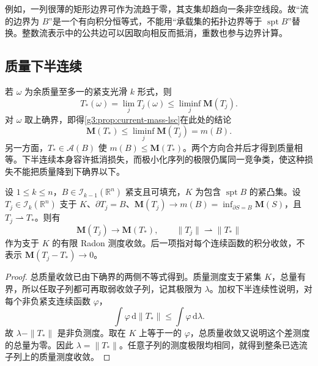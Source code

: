 \ProseParagraphBreak
例如，一列很薄的矩形边界可作为流趋于零，其支集却趋向一条非空线段。故“流的边界为 \(B\)”是一个有向积分恒等式，不能用“承载集的拓扑边界等于 \(\operatorname{spt}B\)”替换。整数流表示中的公共边可以因取向相反而抵消，重数也参与边界计算。

\subsection{质量下半连续}
\label{g3:subsec:2302:03}
若 \(\omega\) 为余质量至多一的紧支光滑 \(k\) 形式，则
\[
	T_*(\omega)=\lim_jT_j(\omega)\le\liminf_j\mathbf M(T_j).
\]
对 \(\omega\) 取上确界，即得\cref{g3:prop:current-mass-lsc}在此处的结论
\begin{equation}\label{g3:eq:plateau-limit-lsc}
	\mathbf M(T_*)\le\liminf_j\mathbf M(T_j)=m(B).
\end{equation}
另一方面，\(T_*\in\mathcal A(B)\) 使 \(m(B)\le\mathbf M(T_*)\)。两个方向合并后才得到质量相等。下半连续本身容许抵消损失，而极小化序列的极限仍属同一竞争类，使这种损失不能把质量降到下确界以下。

\begin{proposition}\label{g3:prop:plateau-minimizing-mass-measures}
	设 \(1\le k\le n\)，\(B\in\mathcal I_{k-1}(\mathbb R^n)\) 紧支且可填充，\(K\) 为包含 \(\operatorname{spt}B\) 的紧凸集。设 \(T_j\in\mathcal I_k(\mathbb R^n)\) 支于 \(K\)、\(\partial T_j=B\)、\(\mathbf M(T_j)\to m(B)=\inf_{\partial S=B}\mathbf M(S)\)，且 \(T_j\rightharpoonup T_*\)。则有
	\[
		\mathbf M(T_j)\longrightarrow\mathbf M(T_*),\qquad
		\|T_j\|\rightharpoonup\|T_*\|
	\]
	作为支于 \(K\) 的有限 Radon 测度收敛。后一项指对每个连续函数的积分收敛，不表示 \(\mathbf M(T_j-T_*)\to0\)。
\end{proposition}
\begin{proof}
	总质量收敛已由下确界的两侧不等式得到。质量测度支于紧集 \(K\)，总量有界，所以任取子列都可再取弱收敛子列，记其极限为 \(\lambda\)。加权下半连续性说明，对每个非负紧支连续函数 \(\varphi\)，
	\[
		\int\varphi\,\mathrm d\|T_*\|\le\int\varphi\,\mathrm d\lambda.
	\]
	故 \(\lambda-\|T_*\|\) 是非负测度。取在 \(K\) 上等于一的 \(\varphi\)，总质量收敛又说明这个差测度的总量为零。因此 \(\lambda=\|T_*\|\)。任意子列的测度极限均相同，就得到整条已选流子列上的质量测度收敛。
\end{proof}

